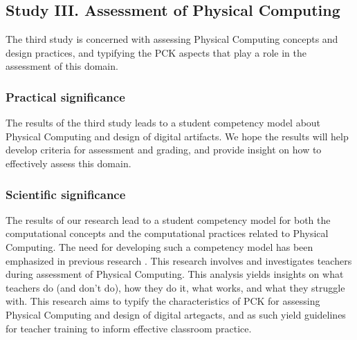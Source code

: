 \subsection{Study III. Assessment of Physical Computing}

The third study is concerned with assessing Physical Computing concepts and design practices, and typifying the PCK aspects that play a role in the assessment of this domain.


\subsubsection*{Practical significance}
The results of the third study leads to a student competency model about Physical Computing and design of digital artifacts. We hope the results will help develop criteria for assessment and grading, and provide insight on how to effectively assess this domain.


\subsubsection*{Scientific significance}
The results of our research lead to a student competency model for both the computational concepts and the computational practices related to Physical Computing. The need for developing such a competency model has been emphasized in previous research \cite{mareen2018PhysComp}. This research involves and investigates teachers during assessment of Physical Computing. This analysis yields insights on what teachers do (and don't do), how they do it, what works, and what they struggle with. This research aims to typify the characteristics of PCK for assessing Physical Computing and design of digital artegacts, and as such yield guidelines for teacher training to inform effective classroom practice.


